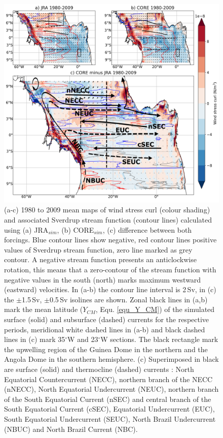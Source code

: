 \documentclass[os, manuscript]{copernicus}
\begin{document}
\begin{figure}[t]
	\includegraphics[width=12cm]{../../figures/paper/f01_mean_curl_and_current_schema.png}
	\caption{(a-c) 1980 to 2009 mean maps of wind stress curl (colour shading) and associated Sverdrup stream function (contour lines) calculated using (a) JRA$_{sim}$, (b) CORE$_{sim}$, (c) difference between both forcings. Blue contour lines show negative, red contour lines positive values of Sverdrup stream function, zero line marked as grey contour. A negative stream function presents an anticlockwise rotation, this means that a zero-contour of the stream function with negative values in the south (north) marks maximum westward (eastward) velocities. In (a-b) the contour line interval is 2$\,$Sv, in (c) the $\pm$1.5$\,$Sv, $\pm$0.5$\,$Sv isolines are shown. Zonal black lines in (a,b) mark the mean latitude ($ Y_{CM} $, Equ. \ref{equ_Y_CM}) of the simulated surface (solid) and subsurface (dashed) currents for the respective periods, meridional white dashed lines in (a-b) and black dashed lines in (c) mark 35$^{\circ}$W and 23$^{\circ}$W sections. The black rectangle mark the upwelling region of the Guinea Dome in the northern and the Angola Dome in the southern hemisphere. (c) Superimposed in black are surface (solid) and thermocline (dashed) currents \citep[adapted from][based on observations]{Burmeister2019}: North Equatorial Countercurrent (NECC), northern branch of the NECC (nNECC), North Equatorial Undercurrent (NEUC), northern branch of the South Equatorial Current (nSEC) and central branch of the South Equatorial Current (cSEC), Equatorial Undercurrent (EUC), South Equatorial Undercurrent (SEUC), North Brazil Undercurrent (NBUC) and North Brazil Current (NBC).}
	\label{fig_mean_curl}
\end{figure}
\end{document}
